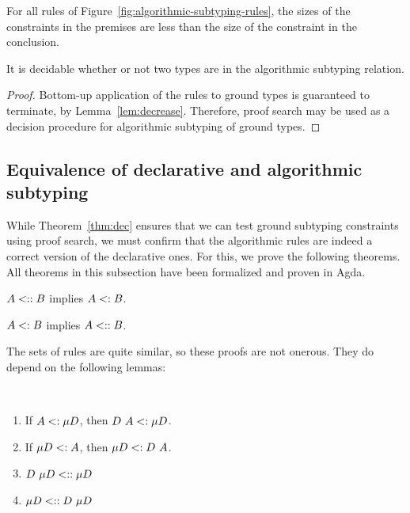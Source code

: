 \documentclass[runningheads]{llncs}
\begin{document}
\begin{lemma}[Decrease]
  \label{lem:decrease}
  For all rules of Figure~\ref{fig:algorithmic-subtyping-rules}, the sizes
  of the constraints in the premises are less than the size of the constraint
  in the conclusion.
\end{lemma}

\begin{theorem}[Decidability]
  \label{thm:dec}
  It is decidable whether or not two types are in the algorithmic subtyping
  relation.
\end{theorem}
\begin{proof}
  Bottom-up application of the rules to ground types is guaranteed to terminate,
  by Lemma~\ref{lem:decrease}.  Therefore, proof search may be used as a decision
  procedure for algorithmic subtyping of ground types.
\end{proof}

\subsection{Equivalence of declarative and algorithmic subtyping}
\label{sec:equiv}

While Theorem~\ref{thm:dec} ensures that we can test ground subtyping
constraints using proof search, we must confirm that the algorithmic
rules are indeed a correct version of the declarative ones.  For this,
we prove the following theorems.  All theorems in this subsection have
been formalized and proven in Agda.

\begin{theorem}[Soundness]
  $A \mathrel{<::} B$ implies $A \mathrel{<:} B$.
\end{theorem}

\begin{theorem}[Completeness]
  \label{thm:completeness}
  $A \mathrel{<:} B$ implies $A \mathrel{<::} B$.
\end{theorem}

\noindent The sets of rules are quite similar, so these proofs are not onerous.  They do depend on the following
lemmas:

\begin{lemma}
  \

  \begin{enumerate}
    \item If $A \mathrel{<:} \mu D$, then $D ~ A \mathrel{<:} \mu D$.
\item  If $\mu D \mathrel{<:} A$, then $\mu D \mathrel{<:} D ~ A$.
\item  $D ~ \mu D \mathrel{<::} \mu D$
\item  $\mu D \mathrel{<::} D ~ \mu D$
\end{enumerate}
\end{lemma}
\end{document}
